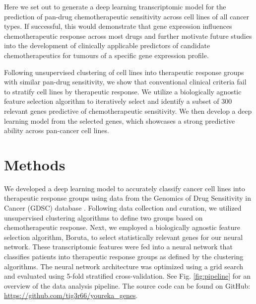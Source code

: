 \documentclass[10pt, letterpaper, twocolumn]{article}
\begin{document}
Here we set out to generate a deep learning transcriptomic model for the prediction of pan-drug chemotherapeutic sensitivity across cell lines of all cancer types. If successful, this would demonstrate that gene expression influences chemotherapeutic response across most drugs and further motivate future studies into the development of clinically applicable predictors of candidate chemotherapeutics for tumours of a specific gene expression profile.

Following unsupervised clustering of cell lines into therapeutic response groups with similar pan-drug sensitivity, we show that conventional clinical criteria fail to stratify cell lines by therapeutic response. We utilize a biologically agnostic feature selection algorithm to iteratively select and identify a subset of 300 relevant genes predictive of chemotherapeutic sensitivity. We then develop a deep learning model from the selected genes, which showcases a strong predictive ability across pan-cancer cell lines.


\section{Methods}
We developed a deep learning model to accurately classify cancer cell lines into therapeutic response groups using data from the Genomics of Drug Sensitivity in Cancer (GDSC) database \cite{gdsc}. Following data collection and curation, we utilized unsupervised clustering algorithms to define two groups based on chemotherapeutic response. Next, we employed a biologically agnostic feature selection algorithm, Boruta, to select statistically relevant genes for our neural network. These transcriptomic features were fed into a neural network that classifies patients into therapeutic response groups as defined by the clustering algorithms. The neural network architecture was optimized using a grid search and evaluated using 5-fold stratified cross-validation. See Fig. \ref{fig:pipeline} for an overview of the data analysis pipeline. The source code can be found on GitHub: \url{https://github.com/tig3r66/youreka_genes}.
\end{document}
